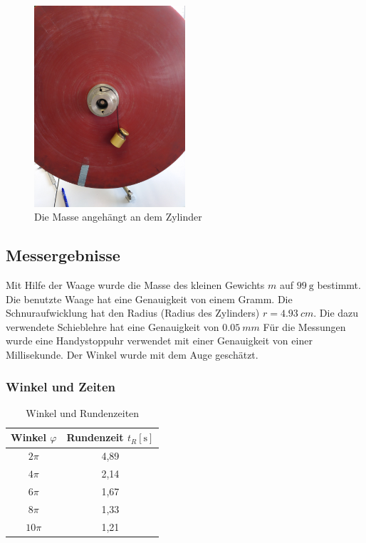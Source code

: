 \documentclass{article}
\begin{document}
			\begin{figure}
				\centering
				\includegraphics[width=0.5\textwidth]{Winkelbeschleunigung.jpg}
				\caption{\label{fig:Angehängte Masse}Die Masse angehängt an dem Zylinder}
			\end{figure}

		\subsection{Messergebnisse}
			Mit Hilfe der Waage wurde die Masse des kleinen Gewichts \(m\) auf \(\SI{99}{\gram}\) bestimmt.
			Die benutzte Waage hat eine Genauigkeit von einem Gramm.
			Die Schnuraufwicklung hat den Radius (Radius des Zylinders) \(r = \SI{4.93}{cm}\).
			Die dazu verwendete Schieblehre hat eine Genauigkeit von \(\SI{0.05}{mm}\) 
			Für die Messungen wurde eine Handystoppuhr verwendet mit einer Genauigkeit von einer Millisekunde.
			Der Winkel wurde mit dem Auge geschätzt. \\

			\subsubsection{Winkel und Zeiten}
				\begin{table}[!ht]
					\centering
					\begin{tabular}{ | c | c | } 
						\hline
						Winkel \( \varphi \) & Rundenzeit \(t_R [\unit{\second}]\) \\
						\hline
						\( 2\pi \) & 4,89 \\
						\( 4\pi \) & 2,14 \\
						\( 6\pi \) & 1,67 \\
						\( 8\pi \) & 1,33 \\
						\( 10\pi \) & 1,21 \\
						\hline
					\end{tabular}
					\caption{Winkel und Rundenzeiten}
				\end{table}
				
\end{document}
